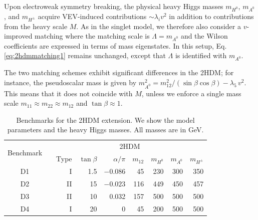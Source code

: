 Upon electroweak symmetry breaking, the physical heavy Higgs masses
$m_{H^0}$, $m_{A^0}$, and $m_{H^{\pm}}$ acquire VEV-induced
contributions $\sim \lambda_i v^2$ in addition to contributions from
the heavy scale $M$.  As in the singlet model, we therefore also
consider a $v$-improved matching where the matching scale is $\Lambda
= m_{A^0}$ and the Wilson coefficients are expressed in terms of mass
eigenstates.  In this setup, Eq.\,\eqref{eq:2hdmmatching1} remains
unchanged, except that $\Lambda$ is identified with $m_{A^0}$.

The two matching schemes exhibit significant differences in the 2HDM;
for instance, the pseudoscalar mass is given by $m^2_{A^0} =
m_{12}^2/(\sin\beta\cos\beta) -\lambda_5\,v^2$. This means that it
does not coincide with $M$, unless we enforce a single mass scale
$m_{11} \approx m_{22} \approx m_{12}$ and $\tan \beta \approx
1$.\medskip

\begin{table}[t] \renewcommand{\arraystretch}{1.2} \centering
  \begin{tabular}{c c rrrrrrr } \toprule \multirow{2}{*}{Benchmark}
&\hspace*{1em}& \multicolumn{7}{c}{2HDM} \\ \cmidrule{3-9} && Type &
$\tan\beta$ & $\alpha/\pi$ & $m_{12} $ & $m_{H^0} $ & $m_{A^0} $ &
$m_{H^\pm}$ \\ \midrule D1 && I & 1.5 & $-0.086$ & 45 & 230 & 300 &
350 \\ D2 && II & 15 & $-0.023$ & 116 & 449 & 450 & 457 \\ D3 && II &
10 & 0.032 & 157 & 500 & 500 & 500 \\ D4 && I & 20 & 0 & 45 & 200 &
500 & 500 \\ \bottomrule
  \end{tabular}
 \caption{Benchmarks for the 2HDM extension. We show the model
parameters and the heavy Higgs masses. All masses are in GeV.}
 \label{tab:2hdm_benchmarks}
\end{table}

